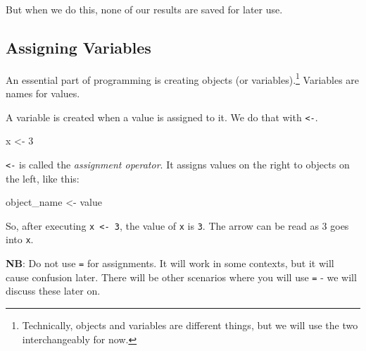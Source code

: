 \documentclass[
]{book}
\newenvironment{Shaded}{\begin{snugshade}}{\end{snugshade}}
\newcommand{\CommentTok}[1]{\textcolor[rgb]{0.56,0.35,0.01}{\textit{#1}}}
\newcommand{\DecValTok}[1]{\textcolor[rgb]{0.00,0.00,0.81}{#1}}
\newcommand{\NormalTok}[1]{#1}
\newcommand{\OperatorTok}[1]{\textcolor[rgb]{0.81,0.36,0.00}{\textbf{#1}}}
\newcommand{\StringTok}[1]{\textcolor[rgb]{0.31,0.60,0.02}{#1}}
\begin{document}
\begin{Shaded}
\end{Shaded}

But when we do this, none of our results are saved for later use.

\hypertarget{assigning-variables}{%
\subsection{Assigning Variables}\label{assigning-variables}}

An essential part of programming is creating objects (or variables).\footnote{Technically, objects and variables are different things, but we will use the two interchangeably for now.} Variables are names for values.

A variable is created when a value is assigned to it. We do that with \texttt{\textless{}-}.

\begin{Shaded}
\begin{Highlighting}[]
\NormalTok{x <-}\StringTok{ }\DecValTok{3}
\end{Highlighting}
\end{Shaded}

\texttt{\textless{}-} is called the \emph{assignment operator}. It assigns values on the right to objects on the left, like this:

\begin{Shaded}
\begin{Highlighting}[]
\NormalTok{object_name <-}\StringTok{ }\NormalTok{value}
\end{Highlighting}
\end{Shaded}

So, after executing \texttt{x\ \textless{}-\ 3}, the value of \texttt{x} is \texttt{3}. The arrow can be read as 3 goes into \texttt{x}.

\textbf{NB}: Do not use \texttt{=} for assignments. It will work in some contexts, but it will cause confusion later. There will be other scenarios where you will use \texttt{=} - we will discuss these later on.
\end{document}
